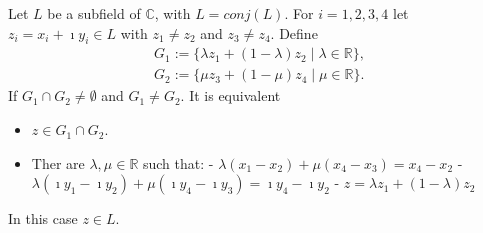\begin{lemma}
    \label{lem:ConjClosed.Intersection_line_line}
    \leanok
    Let $L$ be a subfield of $\mathbb{C}$, with $L = conj(L)$. For $i = 1,2,3,4$ let $z_i = x_i + \imath y_i \in L$ with $z_1 \ne z_2$ and $z_3 \ne z_4$. Define
    \begin{equation*}\begin{aligned}
        G_1 := \{\lambda z_1 + (1-\lambda)z_2 \mid \lambda \in \mathbb{R}\},\\
        G_2 := \{\mu z_3 + (1-\mu)z_4 \mid \mu \in \mathbb{R}\}.
    \end{aligned} \end{equation*}
    If $G_1 \cap G_2 \ne \emptyset$ and $G_1 \ne G_2$. It is equivalent 
    \begin{itemize}
        \item $z\in G_1 \cap G_2$.
        \item Ther are $\lambda, \mu \in \mathbb{R}$ such that:
        \subitem - $\lambda(x_1 - x_2)+\mu(x_4-x_3) = x_4-x_2$
        \subitem - $\lambda(\imath y_1 - \imath y_2)+\mu(\imath y_4-\imath y_3) = \imath y_4-\imath y_2$
        \subitem - $z = \lambda z_1 + (1-\lambda)z_2$
    \end{itemize}
    In this case $z \in L$.
\end{lemma}
